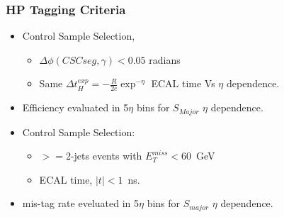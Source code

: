 \documentclass{beamer}
\begin{document}
\begin{frame}
\frametitle{HP Tagging Criteria}
   \begin{minipage}[t]{\linewidth}
     \begin{tcolorbox}[colback=UNL@Cream!5,colframe=UMN@Maroon!40,title=\textcolor{UMN@Maroon}{\textbf{Halo Photon Tagging Efficiency}}]
        \begin{itemize}
         \item Control Sample Selection,
           \begin{itemize}
            \item $\Delta\phi(CSC seg, \gamma) < 0.05$ radians
            \item Same $ \Delta t^{exp}_{H}= -\frac{R}{2c}\exp^{-\eta} $ ECAL time Vs $\eta$ dependence.
           \end{itemize}
         \item Efficiency evaluated in 5$\eta$ bins for $S_{Major}$ $\eta$ dependence.
        \end{itemize}
      \end{tcolorbox} 
   \end{minipage}
   \begin{minipage}[t]{\linewidth} 
     \begin{tcolorbox}[colback=UNL@Cream!5,colframe=UMN@Maroon!40,title=\textcolor{UMN@Maroon}{\textbf{Halo Photon mis-Tag Rate}}]
      \begin{itemize}
         \item Control Sample Selection:
           \begin{itemize}
            \item $ >= 2$-jets events with $E^{miss}_{T} < 60$~GeV
            \item ECAL time, $|t| < 1$~ns.
           \end{itemize}
          \item mis-tag rate eveluated in 5$\eta$ bins for $S_{major}$ $\eta$ dependence.         
        \end{itemize}
      \end{tcolorbox}
  \end{minipage}
\end{frame}
\end{document}
